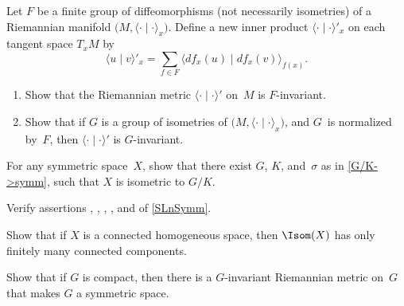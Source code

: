 \begin{exercises}
\item \label{FiniteAvgMetric}
 Let $F$ be a finite group of diffeomorphisms (not necessarily
isometries) of a Riemannian manifold $\bigl( M, \langle \cdot \mid
\cdot \rangle_x \bigr)$. Define a new inner product $\langle \cdot
\mid \cdot \rangle'_x$ on each tangent space $T_xM$ by
 $$ \langle u \mid v \rangle'_x
 = \sum_{f \in F} \langle df_x(u) \mid df_x(v) \rangle_{f(x)} .$$
 \begin{enumerate}
 \item Show that the Riemannian metric $\langle \cdot \mid \cdot
\rangle'$ on~$M$ is $F$-invariant.
 \item Show that if $G$ is a group of isometries of $\bigl( M,
\langle \cdot \mid \cdot \rangle_x \bigr)$, and $G$~is normalized
by~$F$, then $\langle \cdot \mid \cdot \rangle'$ is $G$-invariant.
 \end{enumerate}

\item \label{symm->G/K}
 For any symmetric space~$X$, show that there exist $G$, $K$,
and~$\sigma$ as in \cref{G/K->symm}, such that $X$ is
isometric to $G/K$. 

\item Verify assertions
 , , ,
, and 
 of \cref{SLnSymm}.

\item \label{IsomFinComps}
Show that if $X$ is a connected homogeneous space, then
$\Isom(X)$ has only finitely many connected components.

\item \label{X=G}
 Show that if $G$ is compact, then there is a $G$-invariant
Riemannian metric on~$G$ that makes $G$ a symmetric space.

\end{exercises}





